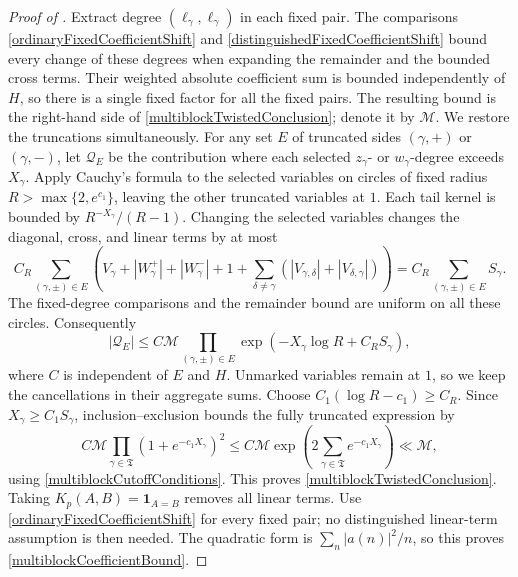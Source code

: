 \documentclass[oneside, 12pt]{amsart}
\theoremstyle{definition}
\begin{document}
\begin{proof}[Proof of
		]
{			Extract degree $(\ell_\gamma,\ell_\gamma)$ in each fixed pair.
			The comparisons \eqref{ordinaryFixedCoefficientShift} and
			\eqref{distinguishedFixedCoefficientShift} bound every change of these
			degrees when expanding the remainder and the bounded cross terms.
			Their weighted absolute coefficient sum is bounded independently of
			$H$, so there is a single fixed factor for all the fixed pairs.
			The resulting bound is the right-hand side of
			\eqref{multiblockTwistedConclusion}; denote it by $\mathcal M$.
			We restore the truncations simultaneously. For any set $E$ of truncated
			sides $(\gamma,+)$ or $(\gamma,-)$, let $\mathcal Q_E$ be the
			contribution where each selected $z_\gamma$- or $w_\gamma$-degree
			exceeds $X_\gamma$. Apply Cauchy's formula to the selected variables
			on circles of fixed radius $R>\max\{2,e^{c_1}\}$, leaving the other
			truncated variables at $1$. Each tail kernel is bounded by
			$R^{-X_\gamma}/(R-1)$. Changing the selected variables changes the
			diagonal, cross, and linear terms by at most
			\[
			C_R\sum_{(\gamma,\pm)\in E}
			\left(V_\gamma+|W_\gamma^+|+|W_\gamma^-|+1+
			\sum_{\delta\ne\gamma}(|V_{\gamma,\delta}|+|V_{\delta,\gamma}|)\right)
			=C_R\sum_{(\gamma,\pm)\in E}S_\gamma.
			\]
			The fixed-degree comparisons and the remainder bound are uniform on
			all these circles. Consequently
			\[
			|\mathcal Q_E|\leq C\mathcal M
			\prod_{(\gamma,\pm)\in E}
			\exp(-X_\gamma\log R+C_RS_\gamma),
			\]
			where $C$ is independent of $E$ and $H$. Unmarked variables remain
			at $1$, so we keep the cancellations in their aggregate sums.
			Choose $C_1(\log R-c_1)\geq C_R$. Since $X_\gamma\geq C_1S_\gamma$,
			inclusion--exclusion bounds the fully truncated expression by
			\[
			C\mathcal M\prod_{\gamma\in\mathfrak T}(1+e^{-c_1X_\gamma})^2
			\leq C\mathcal M\exp\left(2\sum_{\gamma\in\mathfrak T}
			e^{-c_1X_\gamma}\right)\ll\mathcal M,
			\]
			using \eqref{multiblockCutoffConditions}. This proves
			\eqref{multiblockTwistedConclusion}.
			Taking $K_p(A,B)=\mathbf1_{A=B}$ removes all linear terms. Use
			\eqref{ordinaryFixedCoefficientShift} for every fixed pair; no
			distinguished linear-term assumption is then needed. The quadratic form is
			$\sum_n|a(n)|^2/n$, so this proves \eqref{multiblockCoefficientBound}.}
	\end{proof}
	
\end{document}
